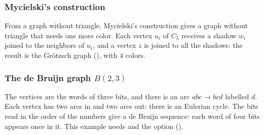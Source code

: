 \newpage
\subsubsection{Mycielski's construction}
From a graph without triangle, Mycielski's construction gives a graph
without triangle that needs one more color. Each vertex $u_i$ of $C_5$
receives a shadow $w_i$ joined to the neighbors of $u_i$, and a vertex $z$ is
joined to all the shadows: the result is the Grötzsch graph
(), with $4$ colors.

\begin{tkzexample}[vbox]
\end{tkzexample}

\newpage
\subsubsection{The de Bruijn graph $B(2,3)$}
The vertices are the words of three bits, and there is an arc
$abc\to bcd$ labelled $d$. Each vertex has two arcs in and two arcs out:
there is an Eulerian cycle. The bits read in the order of the numbers give a
de Bruijn sequence: each word of four bits appears once in it. This example
needs  and the option 
().

